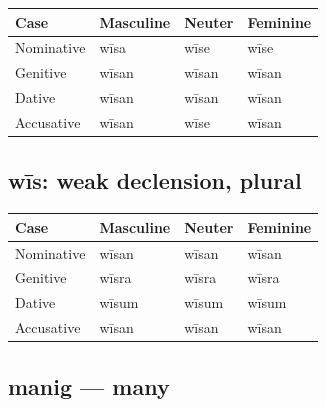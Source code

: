 \par\begingroup
\fontsize{10.5}{13.2}\selectfont
\setlength{\LTleft}{0pt}\setlength{\LTright}{\fill}
\noindent
\begin{tabular}{@{}>{\raggedright\arraybackslash}p{28.89mm}>{\raggedright\arraybackslash}p{28.89mm}>{\raggedright\arraybackslash}p{28.89mm}>{\raggedright\arraybackslash}p{28.89mm}@{}}
\toprule
\textbf{Case} & \textbf{Masculine} & \textbf{Neuter} & \textbf{Feminine} \\
\midrule
Nominative & wīsa & wīse & wīse \\
Genitive & wīsan & wīsan & wīsan \\
Dative & wīsan & wīsan & wīsan \\
Accusative & wīsan & wīse & wīsan \\
\bottomrule
\end{tabular}
\par\endgroup

\subsection*{wīs: weak declension, plural}

\par\begingroup
\fontsize{10.5}{13.2}\selectfont
\setlength{\LTleft}{0pt}\setlength{\LTright}{\fill}
\noindent
\begin{tabular}{@{}>{\raggedright\arraybackslash}p{28.89mm}>{\raggedright\arraybackslash}p{28.89mm}>{\raggedright\arraybackslash}p{28.89mm}>{\raggedright\arraybackslash}p{28.89mm}@{}}
\toprule
\textbf{Case} & \textbf{Masculine} & \textbf{Neuter} & \textbf{Feminine} \\
\midrule
Nominative & wīsan & wīsan & wīsan \\
Genitive & wīsra & wīsra & wīsra \\
Dative & wīsum & wīsum & wīsum \\
Accusative & wīsan & wīsan & wīsan \\
\bottomrule
\end{tabular}
\par\endgroup

\subsection*{manig — many}

